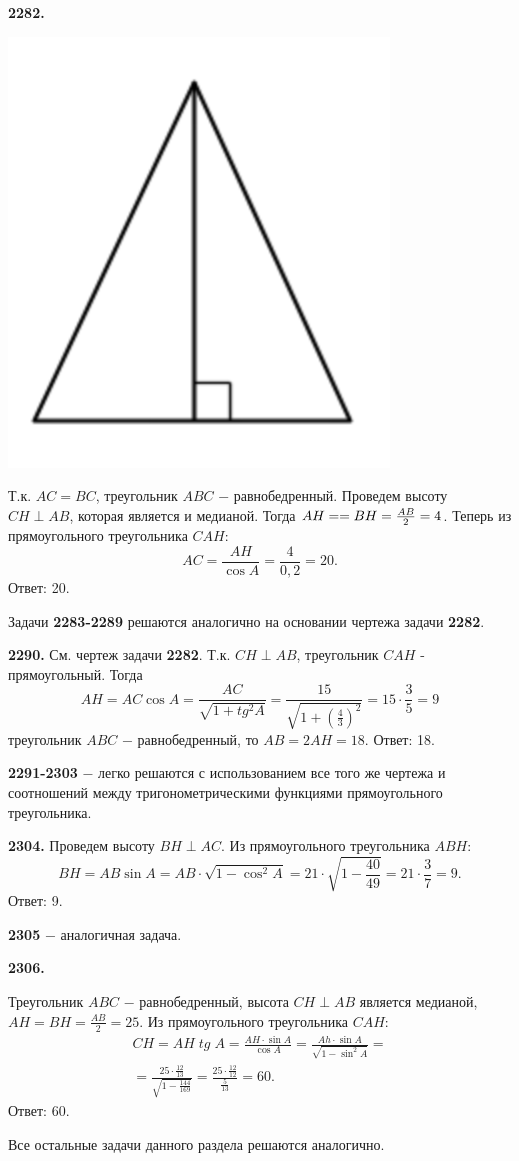 \textbf{2282.}

{\centering \includegraphics[width=0.35\linewidth]{Geometry/Content/53.png}
	
}

Т.к. $AC=BC$,  треугольник $ABC$ $-$ равнобедренный. Проведем высоту $CH \perp AB$, которая является и медианой. Тогда $AH=\linebreak=BH=\frac{AB}{2}=4$. Теперь из прямоугольного треугольника $CAH$:
\[
AC=\frac{AH}{\cos{A}}=\frac{4}{0,2}=20.
\] \null \hspace*{\fill} Ответ: 20.

 Задачи \textbf{2283-2289} решаются аналогично на основании чертежа задачи \textbf{2282}.
 
 \textbf{2290.} См. чертеж задачи \textbf{2282}. Т.к. $CH \perp AB$, треугольник $CAH$ - прямоугольный. Тогда
 \[
 AH=AC\cos{A} =\frac{AC}{\sqrt{1+tg^2A}}=\frac{15}{\sqrt{1+ \left( \frac{4}{3} \right)^2}}=15\cdot\frac{3}{5}=9
 \] 
 треугольник $ABC$ $-$ равнобедренный, то $AB=2AH=18$. \newline \null \hspace*{\fill} Ответ: 18.
 
 \textbf{2291-2303} $-$ легко решаются с использованием все того же чертежа и соотношений между тригонометрическими функциями прямоугольного треугольника.
 
 \textbf{2304.} Проведем высоту $BH\perp AC$. Из прямоугольного треугольника $ABH$:
 \[
 BH = AB\sin{A}=AB\cdot\sqrt{1-\cos^2{A}}=21\cdot\sqrt{1-\frac{40}{49}}=21\cdot\frac{3}{7}=9.
 \] \null \hspace*{\fill} Ответ: 9.
 
 \textbf{2305} $-$ аналогичная задача.
 
 \textbf{2306.}
 
 Треугольник $ABC$ $-$ равнобедренный, высота $CH \perp AB$ является медианой, $AH=BH=\frac{AB}{2}=25$. Из прямоугольного треугольника $CAH$:
 \begin{multline*}
 CH=AH\;tg\;A=\frac{AH\cdot\sin{A}}{\cos{A}}=\frac{Ah\cdot\sin{A}}{\sqrt{1-\sin^2{A}}}=\\=\frac{25\cdot \frac{12}{13}}{\sqrt{1-\frac{144}{169}}} =\frac{25\cdot\frac{12}{12}}{\frac{5}{13}} = 60.
 \end{multline*} \null \hspace*{\fill} Ответ: 60.

Все остальные задачи данного раздела решаются аналогично.